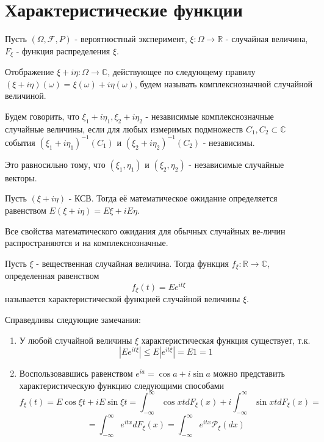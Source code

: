 \section{Характеристические функции}
Пусть $(\Omega, \mathcal{F}, P)$ - вероятностный эксперимент, $\xi: \Omega \to \mathbb{R}$ - случайная величина, $F_{\xi}$ - функция распределения $\xi$.
\begin{definition}
	Отображение $\xi + i \eta: \Omega \to \mathbb{C}$, действующее по следующему правилу $(\xi + i \eta) (\omega) = \xi (\omega) + i \eta (\omega)$, будем называть комплекснозначной случайной величиной.
\end{definition}
\begin{definition}
	Будем говорить, что $\xi_1 + i \eta_1, \xi_2 + i \eta_2$ - независимые комплекснозначные случайные величины, если для любых измеримых подмножеств $C_1, C_2 \subset \mathbb{C}$ события $(\xi_1 + i \eta_1)^{-1} (C_1)$ и $(\xi_2 + i \eta_2)^{-1} (C_2)$ - независимы.
	
	Это равносильно тому, что $(\xi_1, \eta_1)$ и $(\xi_2, \eta_2)$ - независимые случайные векторы.
\end{definition}
\begin{definition}
	Пусть $(\xi + i \eta)$ - КСВ. Тогда её математическое ожидание определяется равенством $E (\xi + i \eta) = E \xi + i E \eta$.
\end{definition}
\begin{remark}
	Все свойства математического ожидания для обычных случайных ве-личин распространяются и на комплекснозначные.
\end{remark}
\begin{definition}
	Пусть $\xi$ - вещественная случайная величина. Тогда функция $f_{\xi}: \mathbb{R} \to \mathbb{C}$, определенная равенством
	\[ f_{\xi} (t) = E e^{it \xi} \]
	называется характеристической функцией случайной величины $\xi$.
\end{definition}
\begin{remark}
	Справедливы следующие замечания:
	\begin{enumerate}
		\item У любой случайной величины $\xi$ характеристическая функция существует, т.к.
		\[ | E e^{it \xi} | \le E |e^{it \xi}| = E1 = 1 \]
		\item Воспользовавшись равенством $e^{ia} = \cos a + i \sin a$ можно представить характеристическую функцию следующими способами
		\[ f_{\xi} (t) = E \cos \xi t + i E \sin \xi t = \int_{-\infty}^{\infty} \cos x td F_{\xi} (x) + i \int_{-\infty}^{\infty} \sin x td F_{\xi} (x) = \]
		\[ = \int_{-\infty}^{\infty} e^{it x} d F_{\xi} (x) = \int_{-\infty}^{\infty} e^{it x} \mathcal{P}_{\xi} (dx) \]
	\end{enumerate}
\end{remark}
